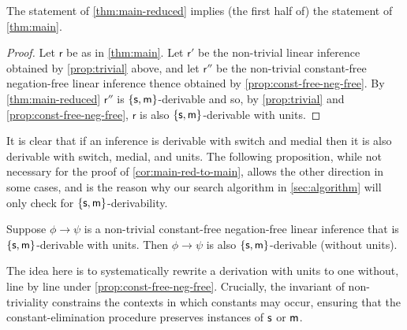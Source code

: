 \documentclass[a4paper, UKenglish, cleveref]{lipics-v2019}
\begin{document}
\begin{corollary}\label{cor:main-red-to-main}
  The statement of \cref{thm:main-reduced} implies (the first half of) the statement of \cref{thm:main}.
\end{corollary}
\begin{proof}
Let $\mathsf r$ be as in \cref{thm:main}.
Let $\mathsf r'$ be the non-trivial linear inference obtained by \cref{prop:trivial} above, and let $\mathsf r''$ be the non-trivial constant-free negation-free linear inference thence obtained by \cref{prop:const-free-neg-free}.
By \cref{thm:main-reduced} $\mathsf r''$ is $\{\mathsf{s},\mathsf{m} \}$-derivable and so, by \cref{prop:trivial} and \cref{prop:const-free-neg-free}, $\mathsf r$ is also $\{\mathsf{s},\mathsf{m} \}$-derivable with units.
\end{proof}
%

It is clear that if an inference is derivable with switch and medial then it is also derivable with switch, medial, and units. The following proposition, while not necessary for the proof of \cref{cor:main-red-to-main}, allows the other direction in some cases, and is the reason why our search algorithm in \cref{sec:algorithm} will only check for $\{\mathsf{s},\mathsf{m}\}$-derivability.

\begin{proposition}
\label{non-triv-const-free-neg-free-derivability-without-units}
  Suppose \(\phi \to \psi \) is a non-trivial constant-free negation-free linear inference that is $\{\mathsf{s},\mathsf{m} \}$-derivable with units. Then \(\phi \to \psi\) is also $\{\mathsf{s},\mathsf{m} \}$-derivable (without units).
\end{proposition}
The idea here is to systematically rewrite a derivation with units to one without, line by line under \cref{prop:const-free-neg-free}.
Crucially, the invariant of non-triviality constrains the contexts in which constants may occur, ensuring that the constant-elimination procedure preserves instances of $\mathsf{s}$ or $\mathsf{m}$.
\end{document}
